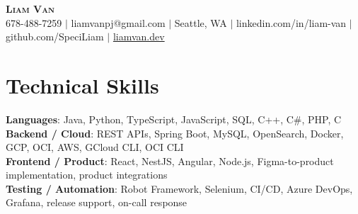 \documentclass[letterpaper,11pt]{article}
\begin{document}

%
\begin{center}
    \textbf{\Huge \scshape Liam Van} \\ \vspace{1pt}
    \small 678-488-7259 $|$ liamvanpj@gmail.com $|$ Seattle, WA $|$
    linkedin.com/in/liam-van $|$ github.com/SpeciLiam $|$ \href{https://liamvan.dev}{liamvan.dev}

\end{center}

\section{Technical Skills}
 \begin{itemize}[leftmargin=0.15in, label={}]
    \small{\item{
     \textbf{Languages}{: Java, Python, TypeScript, JavaScript, SQL, C++, C\#, PHP, C} \\
     \textbf{Backend / Cloud}{: REST APIs, Spring Boot, MySQL, OpenSearch, Docker, GCP, OCI, AWS, GCloud CLI, OCI CLI} \\
     \textbf{Frontend / Product}{: React, NestJS, Angular, Node.js, Figma-to-product implementation, product integrations} \\
     \textbf{Testing / Automation}{: Robot Framework, Selenium, CI/CD, Azure DevOps, Grafana, release support, on-call response} \\
    }}
 \end{itemize}
%

\end{document}

